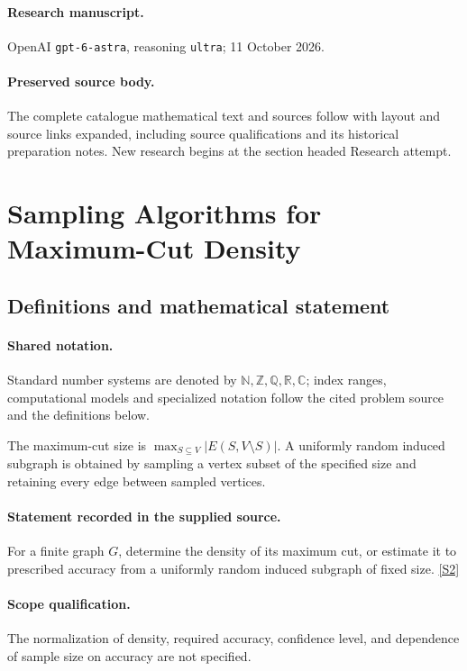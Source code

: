 \documentclass[11pt]{article}
\begin{document}
\paragraph{Research manuscript.} OpenAI \texttt{gpt-6-astra}, reasoning \texttt{ultra}; 11 October 2026.
\paragraph{Preserved source body.} The complete catalogue mathematical text and sources follow with layout and source links expanded, including source qualifications and its historical preparation notes. New research begins at the section headed Research attempt.

\section{Sampling Algorithms for Maximum-Cut Density}\label{statement}

\subsection{Definitions and mathematical statement}

\paragraph{Shared notation.}Standard number systems are denoted by $\mathbb N,\mathbb Z,\mathbb Q,\mathbb R,\mathbb C$; index ranges, computational models and specialized notation follow the cited problem source and the definitions below.


The maximum-cut size is $\max_{S\subseteq V}|E(S,V\setminus S)|$. A uniformly random induced subgraph is obtained by sampling a vertex subset of the specified size and retaining every edge between sampled vertices.
\paragraph{Statement recorded in the supplied source.}
For a finite graph $G$, determine the density of its maximum cut, or estimate it to prescribed accuracy from a uniformly random induced subgraph of fixed size. \href{https://doi.org/10.4171/owr/2006/48}{[S2]}
\paragraph{Scope qualification.}
The normalization of density, required accuracy, confidence level, and dependence of sample size on accuracy are not specified.
\end{document}
